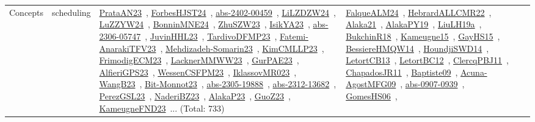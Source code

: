 {\begin{longtable}{lp{3cm}>{\raggedright\arraybackslash}p{6cm}>{\raggedright\arraybackslash}p{6cm}>{\raggedright\arraybackslash}p{8cm}}
\index{scheduling}\index{Concepts!scheduling}Concepts & scheduling & \href{../works/PrataAN23.pdf}{PrataAN23}~\cite{PrataAN23}, \href{../works/ForbesHJST24.pdf}{ForbesHJST24}~\cite{ForbesHJST24}, \href{../works/abs-2402-00459.pdf}{abs-2402-00459}~\cite{abs-2402-00459}, \href{../works/LiLZDZW24.pdf}{LiLZDZW24}~\cite{LiLZDZW24}, \href{../works/LuZZYW24.pdf}{LuZZYW24}~\cite{LuZZYW24}, \href{../works/BonninMNE24.pdf}{BonninMNE24}~\cite{BonninMNE24}, \href{../works/ZhuSZW23.pdf}{ZhuSZW23}~\cite{ZhuSZW23}, \href{../works/IsikYA23.pdf}{IsikYA23}~\cite{IsikYA23}, \href{../works/abs-2306-05747.pdf}{abs-2306-05747}~\cite{abs-2306-05747}, \href{../works/JuvinHHL23.pdf}{JuvinHHL23}~\cite{JuvinHHL23}, \href{../works/TardivoDFMP23.pdf}{TardivoDFMP23}~\cite{TardivoDFMP23}, \href{../works/Fatemi-AnarakiTFV23.pdf}{Fatemi-AnarakiTFV23}~\cite{Fatemi-AnarakiTFV23}, \href{../works/Mehdizadeh-Somarin23.pdf}{Mehdizadeh-Somarin23}~\cite{Mehdizadeh-Somarin23}, \href{../works/KimCMLLP23.pdf}{KimCMLLP23}~\cite{KimCMLLP23}, \href{../works/FrimodigECM23.pdf}{FrimodigECM23}~\cite{FrimodigECM23}, \href{../works/LacknerMMWW23.pdf}{LacknerMMWW23}~\cite{LacknerMMWW23}, \href{../works/GurPAE23.pdf}{GurPAE23}~\cite{GurPAE23}, \href{../works/AlfieriGPS23.pdf}{AlfieriGPS23}~\cite{AlfieriGPS23}, \href{../works/WessenCSFPM23.pdf}{WessenCSFPM23}~\cite{WessenCSFPM23}, \href{../works/IklassovMR023.pdf}{IklassovMR023}~\cite{IklassovMR023}, \href{../works/WangB23.pdf}{WangB23}~\cite{WangB23}, \href{../works/Bit-Monnot23.pdf}{Bit-Monnot23}~\cite{Bit-Monnot23}, \href{../works/abs-2305-19888.pdf}{abs-2305-19888}~\cite{abs-2305-19888}, \href{../works/abs-2312-13682.pdf}{abs-2312-13682}~\cite{abs-2312-13682}, \href{../works/PerezGSL23.pdf}{PerezGSL23}~\cite{PerezGSL23}, \href{../works/NaderiBZ23.pdf}{NaderiBZ23}~\cite{NaderiBZ23}, \href{../works/AlakaP23.pdf}{AlakaP23}~\cite{AlakaP23}, \href{../works/GuoZ23.pdf}{GuoZ23}~\cite{GuoZ23}, \href{../works/KameugneFND23.pdf}{KameugneFND23}~\cite{KameugneFND23}... (Total: 733) & \href{../works/FalqueALM24.pdf}{FalqueALM24}~\cite{FalqueALM24}, \href{../works/HebrardALLCMR22.pdf}{HebrardALLCMR22}~\cite{HebrardALLCMR22}, \href{../works/Alaka21.pdf}{Alaka21}~\cite{Alaka21}, \href{../works/AlakaPY19.pdf}{AlakaPY19}~\cite{AlakaPY19}, \href{../works/LiuLH19a.pdf}{LiuLH19a}~\cite{LiuLH19a}, \href{../works/BukchinR18.pdf}{BukchinR18}~\cite{BukchinR18}, \href{../works/Kameugne15.pdf}{Kameugne15}~\cite{Kameugne15}, \href{../works/GayHS15.pdf}{GayHS15}~\cite{GayHS15}, \href{../works/BessiereHMQW14.pdf}{BessiereHMQW14}~\cite{BessiereHMQW14}, \href{../works/HoundjiSWD14.pdf}{HoundjiSWD14}~\cite{HoundjiSWD14}, \href{../works/LetortCB13.pdf}{LetortCB13}~\cite{LetortCB13}, \href{../works/LetortBC12.pdf}{LetortBC12}~\cite{LetortBC12}, \href{../works/ClercqPBJ11.pdf}{ClercqPBJ11}~\cite{ClercqPBJ11}, \href{../works/ChapadosJR11.pdf}{ChapadosJR11}~\cite{ChapadosJR11}, \href{../works/Baptiste09.pdf}{Baptiste09}~\cite{Baptiste09}, \href{../works/Acuna-AgostMFG09.pdf}{Acuna-AgostMFG09}~\cite{Acuna-AgostMFG09}, \href{../works/abs-0907-0939.pdf}{abs-0907-0939}~\cite{abs-0907-0939}, \href{../works/GomesHS06.pdf}{GomesHS06}~\cite{GomesHS06}, 
\end{longtable}}
